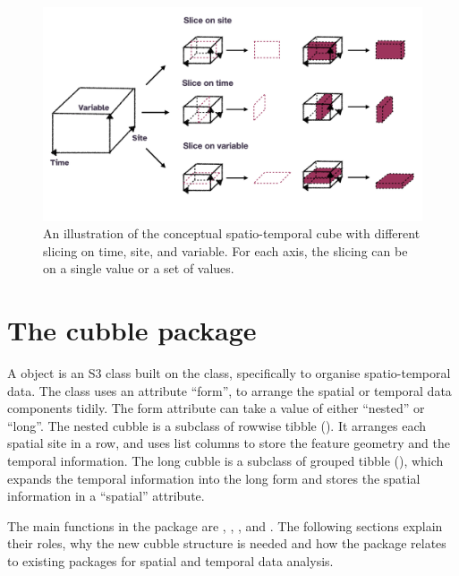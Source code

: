 \documentclass[
]{jss}
\begin{document}
\begin{CodeChunk}
\begin{figure}

{\centering \includegraphics[width=1\linewidth]{../figures/diagram-keynotes/diagram-keynotes.007} 

}

\caption[An illustration of the conceptual spatio-temporal cube with different slicing on time, site, and variable]{An illustration of the conceptual spatio-temporal cube with different slicing on time, site, and variable. For each axis, the slicing can be on a single value or a set of values.}\label{fig:cube-def}
\end{figure}
\end{CodeChunk}

\hypertarget{cubble}{%
\section{The cubble package}\label{cubble}}

A  object is an S3 class \citep{advr} built on the  class, specifically to organise spatio-temporal data. The  class uses an attribute ``form'', to arrange the spatial or temporal data components tidily. The form attribute can take a value of either ``nested'' or ``long''. The nested cubble is a subclass of rowwise tibble (). It arranges each spatial site in a row, and uses list columns to store the feature geometry and the temporal information. The long cubble is a subclass of grouped tibble (), which expands the temporal information into the long form and stores the spatial information in a ``spatial'' attribute.

The main functions in the package are , , , and . The following sections explain their roles, why the new cubble structure is needed and how the package relates to existing packages for spatial and temporal data analysis.
\end{document}

